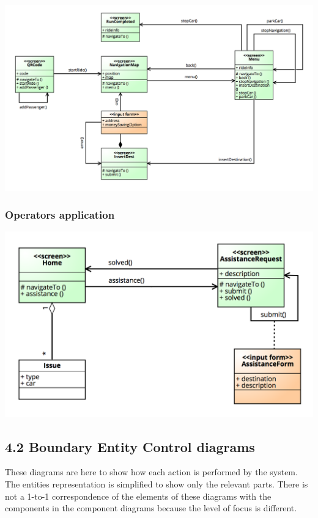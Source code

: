 \documentclass[]{article}
\begin{document}
\centerline{\includegraphics{./images/UX_Car.png}}

\subsubsection{Operators application}\label{operators-application}

\centerline{\includegraphics{./images/UX_Operator.png}}

\subsection{4.2 Boundary Entity Control
diagrams}\label{boundary-entity-control-diagrams}

These diagrams are here to show how each action is performed by the
system. The entities representation is simplified to show only the
relevant parts. There is not a 1-to-1 correspondence of the elements of
these diagrams with the components in the component diagrams because the
level of focus is different.
\end{document}
